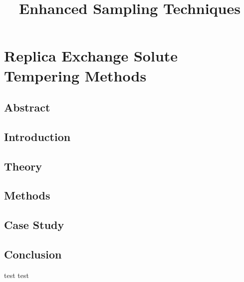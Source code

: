 \documentclass{memoir}
\title{Enhanced Sampling Techniques}
\begin{document}
\date{}

\maketitle

\tableofcontents

\chapter{Replica Exchange Solute Tempering Methods}

\section{Abstract}


\section{Introduction}

  
\section{Theory} 



\section{Methods}

%

\section{Case Study}

%

\section{Conclusion}

test
test


\end{document}
